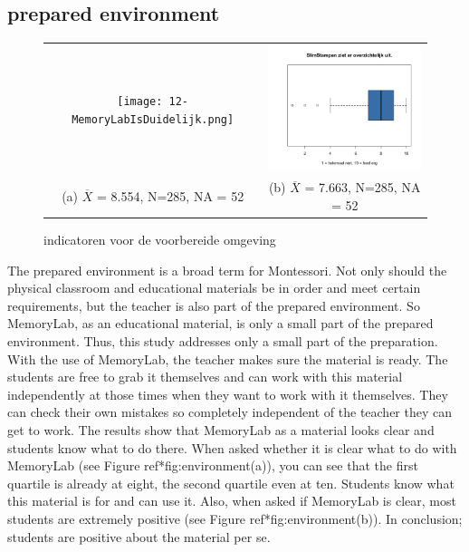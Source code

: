 \documentclass[12pt, a4paper]{article}
\begin{document}
\subsection{prepared environment}
\begin{figure}
    \begin{tabular}{cc}
      \texttt{[image: 12-MemoryLabIsDuidelijk.png]} &   \includegraphics[width=65mm]{14-Overzichtelijk.png} \\
    (a)  $\overline{X}$ = 8.554, N=285, NA = 52 & (b) $\overline{X}$ = 7.663, N=285, NA = 52 \\[6pt]
    \end{tabular}
    \caption{indicatoren voor de voorbereide omgeving}
    \label{fig:omgeving}
    \end{figure}

The prepared environment is a broad term for Montessori. Not only should the physical classroom and educational materials be in order and meet certain requirements, but the teacher is also part of the prepared environment. So MemoryLab, as an educational material, is only a small part of the prepared environment. Thus, this study addresses only a small part of the preparation. With the use of MemoryLab, the teacher makes sure the material is ready. The students are free to grab it themselves and can work with this material independently at those times when they want to work with it themselves. They can check their own mistakes so completely independent of the teacher they can get to work.
The results show that MemoryLab as a material looks clear and students know what to do there. When asked whether it is clear what to do with MemoryLab (see Figure ref*{fig:environment}(a)), you can see that the first quartile is already at eight, the second quartile even at ten. Students know what this material is for and can use it. Also, when asked if MemoryLab is clear, most students are extremely positive (see Figure ref*{fig:environment}(b)). In conclusion; students are positive about the material per se.
\end{document}
